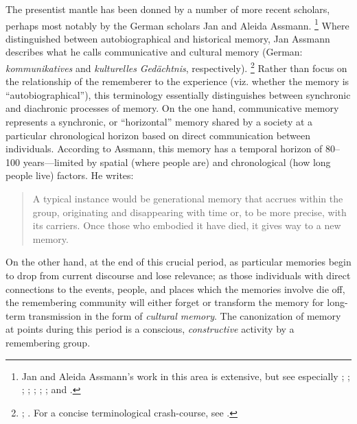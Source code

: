The presentist mantle has been donned by a number of more recent scholars, perhaps most notably by the German scholars Jan and Aleida Assmann.%
    \footnote{%
        Jan and Aleida Assmann's work in this area is extensive, but see especially 
        \cite{a_assmann_poltermann1995}; 
        \cite{a_assmann2011};
        \cite{assmann_nikulin2015}; 
        \cite{assmann2014};
        \cite{assmann2011};
        \cite{assmann_erllnunning2008};
        \cite{assmann2006}; and
        \cite{assmannassmann_merten-etal1994}.}
Where \halbwachs distinguished between autobiographical and historical memory, Jan Assmann describes what he calls communicative and cultural memory (German: \emph{kommunikatives} and \emph{kulturelles} \emph{Gedächtnis}, respectively).%
    \footnote{%
        \Cite[36]{assmann2011};
        \cite{assmann_erllnunning2008}.
        For a concise terminological crash-course, see
        \cite[182--183]{hubenthal_carstens-hasselbalch2012}.}
Rather than focus on the relationship of the rememberer to the experience (viz. whether the memory is ``autobiographical''), this terminology essentially distinguishes between synchronic and diachronic processes of memory. On the one hand, communicative memory represents a synchronic, or ``horizontal'' memory shared by a society at a particular chronological horizon based on direct communication between individuals. According to Assmann, this memory has a temporal horizon of 80--100 years---limited by spatial (where people are) and chronological (how long people live) factors. He writes:  

\begin{quote}
    A typical instance would be generational memory that accrues within the group, originating and disappearing with time or, to be more precise, with its carriers. Once those who embodied it have died, it gives way to a new memory.%
        \autocite[36]{assmann2011} 
\end{quote}  
\noindent
On the other hand, at the end of this crucial period, as particular memories begin to drop from current discourse and lose relevance; as those individuals with direct connections to the events, people, and places which the memories involve die off, the remembering community will either forget or transform the memory for long-term transmission in the form of \emph{cultural memory}. The canonization of memory at points during this period is a conscious, \emph{constructive} activity by a remembering group.%
    \autocite[45]{assmann2011}  

